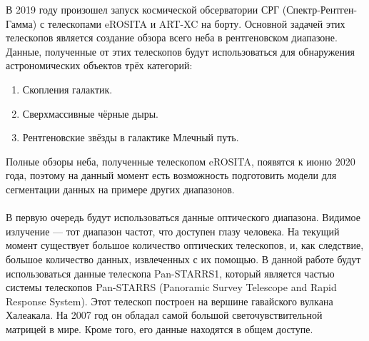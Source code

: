 \Introduction
В 2019 году произошел запуск космической обсерватории СРГ (Спектр-Рентген-Гамма) с телескопами 
eROSITA и ART-XC на борту. Основной задачей этих телескопов является создание обзора всего неба в 
рентгеновском диапазоне. Данные, полученные от этих телескопов будут использоваться для обнаружения 
астрономических объектов трёх категорий:\\
\begin{enumerate}
    \item Скопления галактик.\\
    \item Сверхмассивные чёрные дыры.\\
    \item Рентгеновские звёзды в галактике Млечный путь. \\
\end{enumerate}
Полные обзоры неба, полученные телескопом eROSITA, появятся к июню 2020 года, поэтому на данный 
момент есть возможность подготовить модели для сегментации данных на примере других диапазонов.\\
\\
В первую очередь будут использоваться данные оптического диапазона. Видимое излучение --- тот 
диапазон частот, что доступен глазу человека. На текущий момент существует большое количество 
оптических телескопов, и, как следствие, большое количество данных, извлеченных с их помощью. В 
данной работе будут использоваться данные телескопа Pan-STARRS1, который является частью системы 
телескопов Pan-STARRS (Panoramic Survey Telescope and Rapid Response System). Этот телескоп 
построен на вершине гавайского вулкана Халеакала. На 2007 год он обладал самой большой 
светочувствительной матрицей в мире. Кроме того, его данные находятся в общем доступе.\\
\\
